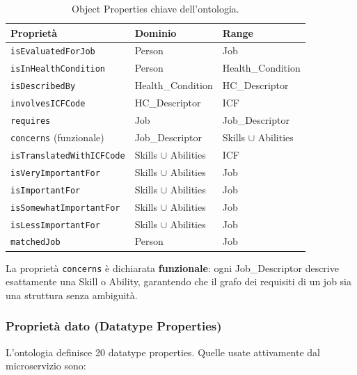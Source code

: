 \documentclass[a4paper,12pt]{article}
\begin{document}
\begin{table}[H]
\centering\small
\caption{Object Properties chiave dell'ontologia.}
\begin{tabular}{L{5cm} L{3.5cm} L{4cm}}
\toprule
\textbf{Propriet\`{a}} & \textbf{Dominio} & \textbf{Range} \\
\midrule
\texttt{isEvaluatedForJob} & Person & Job \\
\texttt{isInHealthCondition} & Person & Health\_Condition \\
\texttt{isDescribedBy} & Health\_Condition & HC\_Descriptor \\
\texttt{involvesICFCode} & HC\_Descriptor & ICF \\
\texttt{requires} & Job & Job\_Descriptor \\
\texttt{concerns} (funzionale) & Job\_Descriptor & Skills $\cup$ Abilities \\
\texttt{isTranslatedWithICFCode} & Skills $\cup$ Abilities & ICF \\
\texttt{isVeryImportantFor} & Skills $\cup$ Abilities & Job \\
\texttt{isImportantFor} & Skills $\cup$ Abilities & Job \\
\texttt{isSomewhat\-ImportantFor} & Skills $\cup$ Abilities & Job \\
\texttt{isLessImportantFor} & Skills $\cup$ Abilities & Job \\
\texttt{matchedJob} & Person & Job \\
\bottomrule
\end{tabular}
\end{table}

La propriet\`{a} \texttt{concerns} \`{e} dichiarata \textbf{funzionale}:
ogni Job\_Descriptor descrive esattamente una Skill o Ability, garantendo
che il grafo dei requisiti di un job sia una struttura senza ambiguit\`{a}.

\subsubsection{Propriet\`{a} dato (Datatype Properties)}

L'ontologia definisce 20 datatype properties. Quelle usate attivamente
dal microservizio sono:
\end{document}
